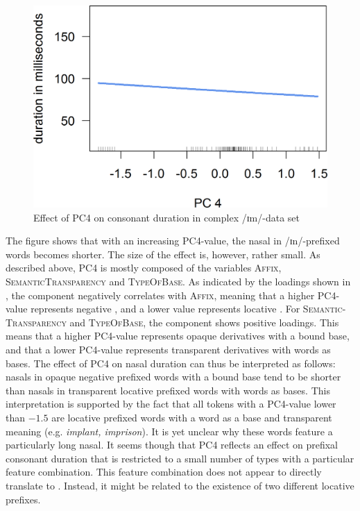 \begin{figure} 
	

	\includegraphics [scale=0.5] {images/Experiment/imModelPC}
	\caption{Effect of PC4 on consonant duration in complex /ɪm/-data set}
	\label{fig:PC 4 imComplex experiment}

\end{figure}


The figure shows that with an increasing \textsc{PC4}-value, the nasal in /ɪn/-prefixed words becomes shorter. The size of the effect is, however, rather small. 
As described above, \textsc{PC4} is mostly composed of the variables \textsc{Affix}, \textsc{SemanticTransparency} and \textsc{TypeOfBase}. As indicated by the loadings shown in , the component negatively correlates with \textsc{Affix}, meaning that a higher \textsc{PC4}-value represents negative , and a lower value represents locative . For \textsc{Semantic- Transparency} and \textsc{TypeOfBase}, the component shows positive loadings. This means that a higher \textsc{PC4}-value represents opaque derivatives with a bound base, and that a lower \textsc{PC4}-value represents transparent derivatives with words as bases.
The effect of \textsc{PC4} on nasal duration can thus be interpreted as follows: nasals in opaque negative prefixed words with a bound base tend to be shorter than nasals in transparent locative prefixed words with words as bases. This interpretation is supported by the fact that all tokens with a \textsc{PC4}-value lower than $-1.5$ are locative prefixed words with a word as a base and transparent meaning (e.g. \textit{implant, imprison}). It is yet unclear why these words feature a particularly long nasal. 
It seems though that \textsc{PC4} reflects an effect on prefixal consonant duration that is restricted to a small number of types with a particular feature combination. This feature combination does not appear to directly translate to .  
Instead, it might be related to the existence of two different locative prefixes. 

